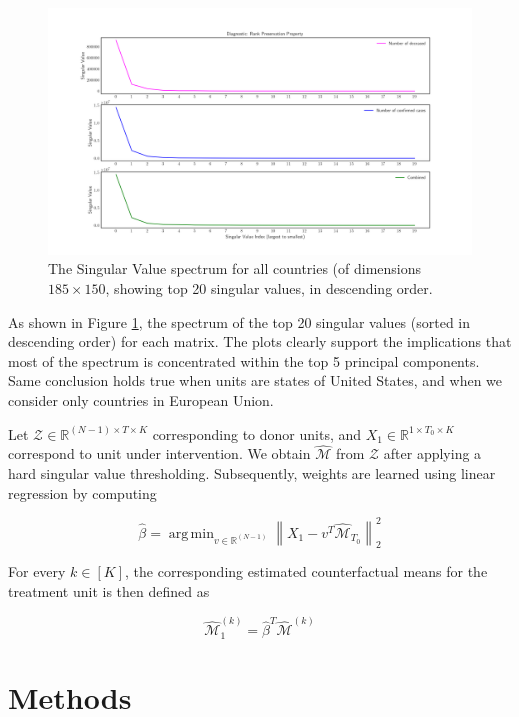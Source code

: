 \documentclass[preprint,authoryear,12pt]{elsarticle}
\DeclareMathOperator*{\argmin}{arg\,min}
\begin{document}
	\begin{figure}[ht]
		\includegraphics[width=\textwidth]{rd}
		\caption{The Singular Value spectrum for all countries (of dimensions $185 \times 150$, showing top 20 singular values, in descending order.} 
		\label{fig1} 
	\end{figure}
	
	As shown in Figure \ref{fig1}, the spectrum of the top 20 singular values (sorted in descending order) for each matrix. The plots clearly support the implications that most of the spectrum is concentrated within the top 5 principal components. Same conclusion holds true when units are states of United States, and when we consider only countries in European Union.\par
	
	Let $\mathcal{Z} \in \mathbb{R}^{(N-1) \times T \times K}$ corresponding to donor units, and $X_1 \in \mathbb{R}^{1 \times T_0 \times K}$ correspond to unit under intervention. We obtain $\hat{\mathcal{M}}$ from $\mathcal{Z}$ after applying a hard singular value thresholding. Subsequently, weights are learned using linear regression by computing
	
	\begin{equation*}
	\hat{\beta} = \argmin_{v \in \mathbb{R}^{(N-1)} } \left\| X_1 - v^T \hat{\mathcal{M}}_{T_0}\right\|^2_2
	\end{equation*}
	
	For every $k \in [K]$, the corresponding estimated counterfactual means for the treatment unit is then defined as
	
	\begin{equation*}
	\hat{\mathcal{M}}_1^{(k)} = \hat{\beta}^T \hat{\mathcal{M}}^{(k)}
	\end{equation*}
	
\section{Methods}
	\label{SEC2}
\end{document}
